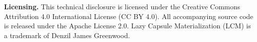 \documentclass[12pt,a4paper]{article}
\begin{document}
\bigskip
\noindent\textbf{Licensing.} This technical disclosure is licensed under the Creative Commons Attribution 4.0 International License (CC BY 4.0). All accompanying source code is released under the Apache License 2.0. Lazy Capsule Materialization (LCM)\texttrademark{} is a trademark of Denzil James Greenwood.
\end{document}
